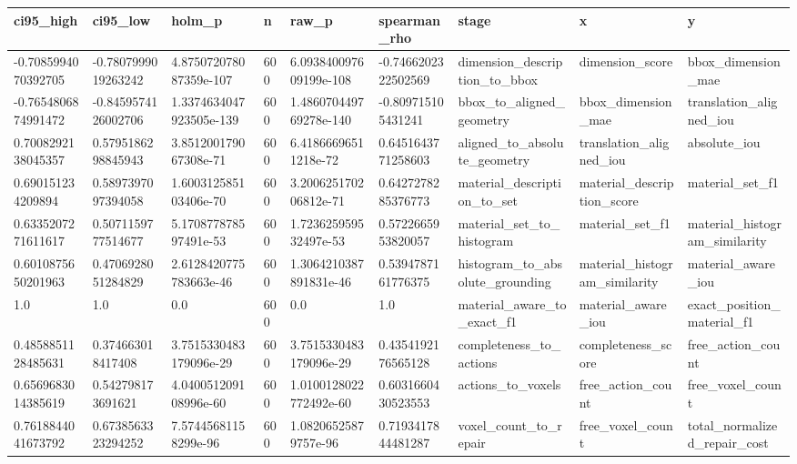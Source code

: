 \begin{tabular}{lllllllll}
ci95_high & ci95_low & holm_p & n & raw_p & spearman_rho & stage & x & y \\\hline
-0.7085994070392705 & -0.7807999019263242 & 4.875072078087359e-107 & 600 & 6.093840097609199e-108 & -0.7466202322502569 & dimension\_description\_to\_bbox & dimension\_score & bbox\_dimension\_mae \\
-0.7654806874991472 & -0.8459574126002706 & 1.3374634047923505e-139 & 600 & 1.486070449769278e-140 & -0.809715105431241 & bbox\_to\_aligned\_geometry & bbox\_dimension\_mae & translation\_aligned\_iou \\
0.7008292138045357 & 0.5795186298845943 & 3.851200179067308e-71 & 600 & 6.41866696511218e-72 & 0.6451643771258603 & aligned\_to\_absolute\_geometry & translation\_aligned\_iou & absolute\_iou \\
0.690151234209894 & 0.5897397097394058 & 1.600312585103406e-70 & 600 & 3.200625170206812e-71 & 0.6427278285376773 & material\_description\_to\_set & material\_description\_score & material\_set\_f1 \\
0.6335207271611617 & 0.5071159777514677 & 5.170877878597491e-53 & 600 & 1.723625959532497e-53 & 0.5722665953820057 & material\_set\_to\_histogram & material\_set\_f1 & material\_histogram\_similarity \\
0.6010875650201963 & 0.4706928051284829 & 2.6128420775783663e-46 & 600 & 1.3064210387891831e-46 & 0.5394787161776375 & histogram\_to\_absolute\_grounding & material\_histogram\_similarity & material\_aware\_iou \\
1.0 & 1.0 & 0.0 & 600 & 0.0 & 1.0 & material\_aware\_to\_exact\_f1 & material\_aware\_iou & exact\_position\_material\_f1 \\
0.4858851128485631 & 0.374663018417408 & 3.7515330483179096e-29 & 600 & 3.7515330483179096e-29 & 0.4354192176565128 & completeness\_to\_actions & completeness\_score & free\_action\_count \\
0.6569683014385619 & 0.542798173691621 & 4.040051209108996e-60 & 600 & 1.0100128022772492e-60 & 0.6031660430523553 & actions\_to\_voxels & free\_action\_count & free\_voxel\_count \\
0.7618844041673792 & 0.6738563323294252 & 7.57445681158299e-96 & 600 & 1.08206525879757e-96 & 0.7193417844481287 & voxel\_count\_to\_repair & free\_voxel\_count & total\_normalized\_repair\_cost \\
\end{tabular}

